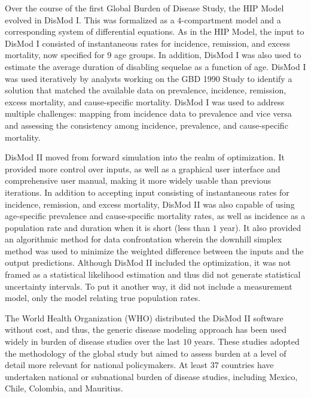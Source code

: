 Over the course of the first Global Burden of Disease Study, the HIP
Model evolved in DisMod
I.\cite{murray_global_1996}
This was formalized as a $4$-compartment model and a corresponding
system of differential equations.  As in the HIP Model, the input to
DisMod I consisted of instantaneous rates for incidence, remission,
and excess mortality, now specified for $9$ age groups.  In addition,
DisMod I was also used to
estimate the average duration of disabling sequelae as a function of
age.  DisMod I was used iteratively by analysts working on the GBD 1990
Study to identify a solution that matched the available data on
prevalence, incidence, remission, excess mortality, and cause-specific
mortality.  DisMod I was used to address multiple challenges: mapping
from incidence data to prevalence and vice versa and assessing the
consistency among incidence, prevalence, and cause-specific mortality.

DisMod II moved from forward simulation into the realm of
optimization.  It provided more control over inputs, as well as a
graphical user interface and comprehensive user manual, making it more
widely usable than previous iterations.\cite{barendregt_generic_2003}
In addition to accepting input consisting of instantaneous rates for incidence,
remission, and excess mortality, DisMod II was also capable of using
age-specific prevalence and cause-specific mortality rates, as well as
incidence as a population rate and duration when it is short (less
than $1$ year).  It also provided an algorithmic method for data
confrontation wherein the downhill simplex method was used to
minimize the weighted difference between the inputs and the output
predictions.  Although DisMod II included the
optimization, it was not framed as a statistical likelihood estimation
and thus did not generate statistical uncertainty intervals.  To put it another
way, it did not include a measurement model, only the model relating
true population rates.

The World Health Organization (WHO) distributed the DisMod II software
without cost, and thus, the generic disease modeling approach
has been used widely in burden of disease studies over the last $10$
years. These studies adopted the methodology of the global study but
aimed to assess burden at a level of detail more relevant for national
policymakers. At least $37$ countries have undertaken national or
subnational burden of disease studies, including Mexico,
Chile, Colombia, and
Mauritius.\cite{Lozano_Burden_1995,republica_de_colombia_ministerio_de_salud_carga_1994,concha_barrientos_carga_1996,Vos_Mauritius_1996}

